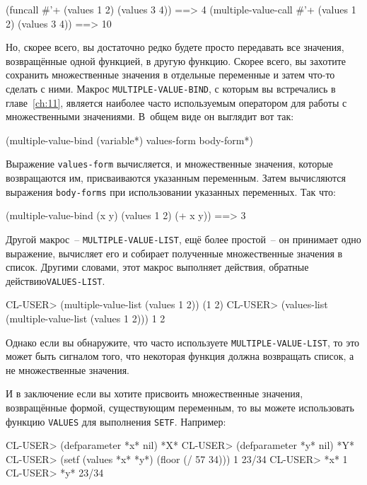 \begin{myverb}
(funcall #'+ (values 1 2) (values 3 4))             ==> 4
(multiple-value-call #'+ (values 1 2) (values 3 4)) ==> 10
\end{myverb}

Но, скорее всего, вы достаточно редко будете просто передавать все значения, возвращённые
одной функцией, в другую функцию.  Скорее всего, вы захотите сохранить множественные
значения в отдельные переменные и затем что-то сделать с ними.  Макрос
\lstinline{MULTIPLE-VALUE-BIND}, с которым вы встречались в главе~\ref{ch:11}, является
наиболее часто используемым оператором для работы с множественными значениями.  В~общем
виде он выглядит вот так:

\begin{myverb}
(multiple-value-bind (variable*) values-form
  body-form*)
\end{myverb}

Выражение \lstinline{values-form} вычисляется, и множественные значения, которые возвращаются
им, присваиваются указанным переменным.  Затем вычисляются выражения \lstinline{body-forms}
при использовании указанных переменных.  Так что:

\begin{myverb}
(multiple-value-bind (x y) (values 1 2)
  (+ x y)) ==> 3
\end{myverb}

Другой макрос~-- \lstinline{MULTIPLE-VALUE-LIST}, ещё более простой~-- он принимает одно
выражение, вычисляет его и собирает полученные множественные значения в список.  Другими
словами, этот макрос выполняет действия, обратные действию\lstinline{VALUES-LIST}.

\begin{myverb}
CL-USER> (multiple-value-list (values 1 2))
(1 2)
CL-USER> (values-list (multiple-value-list (values 1 2)))
1
2
\end{myverb}

Однако если вы обнаружите, что часто используете \lstinline{MULTIPLE-VALUE-LIST}, то это может
быть сигналом того, что некоторая функция должна возвращать список, а не мно\-жес\-твенные
значения.

И в заключение если вы хотите присвоить множественные значения, возвращённые формой,
существующим переменным, то вы можете использовать функцию \lstinline{VALUES} для выполнения
\lstinline{SETF}.  Например:

\begin{myverb}
CL-USER> (defparameter *x* nil)
*X*
CL-USER> (defparameter *y* nil)
*Y*
CL-USER> (setf (values *x* *y*) (floor (/ 57 34)))
1
23/34
CL-USER> *x*
1
CL-USER> *y*
23/34
\end{myverb}

